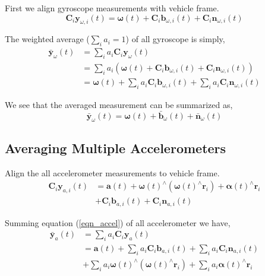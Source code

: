 \documentclass[conference]{IEEEtran}
\begin{document}
First we align gyroscope measurements with vehicle frame.
\begin{equation}
    \textbf{C}_{i} \textbf{y}_{\omega,i}(t) = \bm{\omega}(t) + \textbf{C}_{i} \textbf{b}_{\omega, i}(t) + \textbf{C}_{i} \textbf{n}_{\omega,i}(t)
\end{equation}

The weighted average ($\sum_i{a_i} = 1$) of all gyroscope is simply,
\begin{equation}
\begin{split}
    \bar{\textbf{y}}_\omega(t) &= \sum_i{a_i \textbf{C}_{i} \textbf{y}_\omega(t)} \\
    &= \sum_i{a_i \left( \bm{\omega}(t) + \textbf{C}_{i} \textbf{b}_{\omega,i}(t) + \textbf{C}_{i} \textbf{n}_{\omega,i}(t) \right)} \\
    &= \bm{\omega}(t) + \sum_i{a_i \textbf{C}_{i} \textbf{b}_{\omega,i}(t)} + \sum_i{a_i \textbf{C}_{i} \textbf{n}_{\omega,i}(t)}
\end{split}
\end{equation}

We see that the averaged measurement can be summarized as,
\begin{equation}
    \bar{\textbf{y}}_\omega(t) = \bm{\omega}(t) + \bar{\textbf{b}}_\omega(t) + \bar{\textbf{n}}_\omega(t)
\end{equation}

\subsection{Averaging Multiple Accelerometers}

Align the all accelerometer measurements to vehicle frame.
\begin{equation}\label{eqn_accel}
\begin{split}
    \textbf{C}_{i} \textbf{y}_{a,i}(t) &= \textbf{a}(t) + \bm{\omega}(t)^\wedge (\bm{\omega}(t)^\wedge \textbf{r}_i) + \bm{\alpha}(t)^\wedge \textbf{r}_i \\
    &+ \textbf{C}_{i} \textbf{b}_{a,i}(t) + \textbf{C}_{i} \textbf{n}_{a,i}(t)
\end{split}
\end{equation}

Summing equation (\ref{eqn_accel}) of all accelerometer we have,
\begin{equation}
\begin{split}
    \bar{\textbf{y}}_a(t) &= \sum_i{a_i \textbf{C}_{i} \textbf{y}_a(t)} \\
    &= \textbf{a}(t) + \sum_i{a_i \textbf{C}_{i} \textbf{b}_{a,i}(t)} + \sum_i{a_i \textbf{C}_{i} \textbf{n}_{a,i}(t)} \\
    &+ \sum_i{a_i \bm{\omega}(t)^\wedge (\bm{\omega}(t)^\wedge \textbf{r}_i)} + \sum_i{a_i \bm{\alpha}(t)^\wedge \textbf{r}_i} \\
\end{split}
\end{equation}
\end{document}
